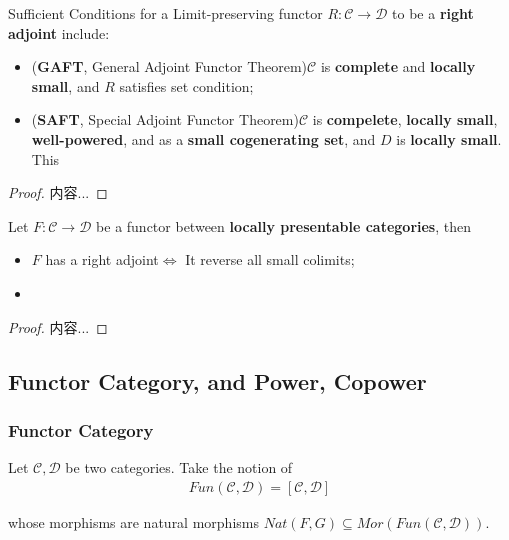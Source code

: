 \documentclass[Total.tex]{subfiles}
\begin{document}
				\begin{theorem}
					Sufficient Conditions for a Limit-preserving functor $R:\mathcal{C}\rightarrow \mathcal{D}$ to be a \textbf{right adjoint} include:
					\begin{itemize}
						\item (\textbf{GAFT}, General Adjoint Functor Theorem)$\mathcal{C}$ is \textbf{complete} and \textbf{locally small}, and $R$ satisfies set condition;
						\item (\textbf{SAFT}, Special Adjoint Functor Theorem)$\mathcal{C}$  is \textbf{compelete}, \textbf{locally small}, \textbf{well-powered}, and as a \textbf{small cogenerating set}, and $D$ is \textbf{locally small}. This
					\end{itemize}
				\end{theorem}
				\begin{proof}
					内容...
				\end{proof}
				
				
				\begin{theorem}
					Let $F:\mathcal{C}\rightarrow\mathcal{D}$ be a functor between \textbf{locally presentable categories}, then
					\begin{itemize}
						\item $F$ has a right adjoint$\Leftrightarrow$ It reverse all small colimits;
						\item 
					\end{itemize}
				\end{theorem}
				\begin{proof}
					内容...
				\end{proof}
			\subsection{Functor Category, and Power, Copower}
				\subsubsection{Functor Category}
					\begin{Def}
						Let $\mathcal{C},\mathcal{D}$ be two categories. Take the notion of
						\begin{gather*}
							Fun(\mathcal{C},\mathcal{D})=[\mathcal{C},\mathcal{D}]
						\end{gather*}
						
						whose morphisms are natural morphisms $Nat(F,G)\subseteq Mor(Fun(\mathcal{C},\mathcal{D}))$. 
					\end{Def}
\end{document}
